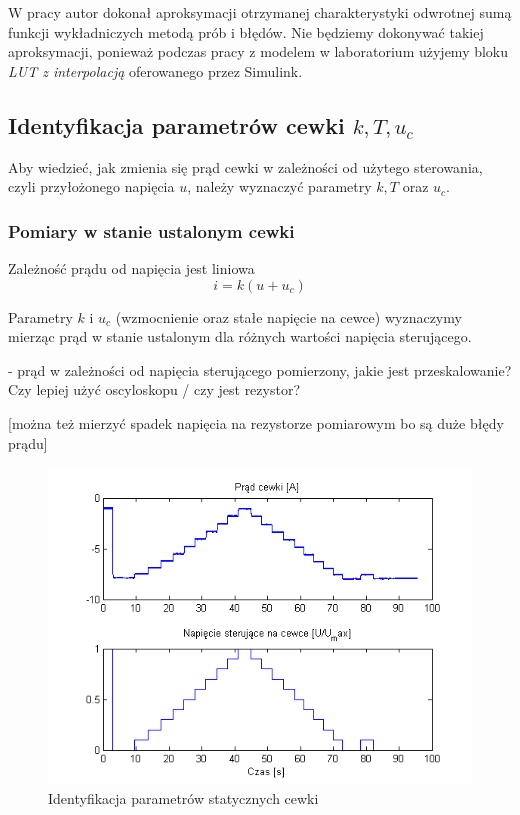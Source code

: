 W pracy \cite{Bania1999} autor dokonał aproksymacji otrzymanej charakterystyki odwrotnej sumą funkcji wykładniczych metodą prób i błędów. Nie będziemy dokonywać takiej aproksymacji, ponieważ podczas pracy z modelem w laboratorium użyjemy bloku \textit{LUT z interpolacją} oferowanego przez Simulink.



\subsection{Identyfikacja parametrów cewki $k, T, u_c$ }

Aby wiedzieć, jak zmienia się prąd cewki w zależności od użytego sterowania, czyli przyłożonego napięcia $u$, należy wyznaczyć parametry $k, T$ oraz $u_c$.

\subsubsection{Pomiary w stanie ustalonym cewki}

Zależność prądu od napięcia jest liniowa
\begin{equation}
i = k(u + u_c)
\end{equation}

Parametry $k$ i $u_c$ (wzmocnienie oraz stałe napięcie na cewce) wyznaczymy mierząc prąd w stanie ustalonym dla różnych wartości napięcia sterującego.

- prąd w zależności od napięcia sterującego pomierzony, jakie jest przeskalowanie? Czy lepiej użyć oscyloskopu / czy jest rezystor?

[można też mierzyć spadek napięcia na rezystorze pomiarowym bo są duże błędy prądu]

\begin{figure}[!htb]
\centering
\includegraphics[scale=0.85]{img/identyfikacja_cewki.png}
\caption{Identyfikacja parametrów statycznych cewki}
\label{rys:cewka_k_uc}
\end{figure}

